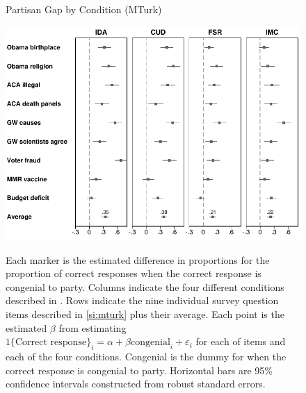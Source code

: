 \documentclass[12pt, letterpaper]{article}
\begin{document}
	\begin{center}
		\begin{figure}[t]
			\centering
			\caption{Partisan Gap by Condition (MTurk)}
			\includegraphics[width=\textwidth]{../figs/partisan-gap-by-item-arm.pdf}
			\label{fig:partisangaps-mturk}
			\caption*{\footnotesize 
				Each marker is the estimated difference in proportions for the proportion of correct responses when the correct response is congenial to party.
				Columns indicate the four different conditions described in . Rows indicate the nine individual survey question items described in \cref{si:mturk} plus their average.
				Each point is the estimated $\beta$ from estimating $1\{\text{Correct response}\}_i = \alpha + \beta \text{congenial}_i + \varepsilon_i$ for each of items and each of the four conditions.	Congenial is the dummy for when the correct response is congenial to party.
				Horizontal bars are 95\% confidence intervals constructed from robust standard errors.
			}
		\end{figure}
	\end{center}
	
\end{document}
